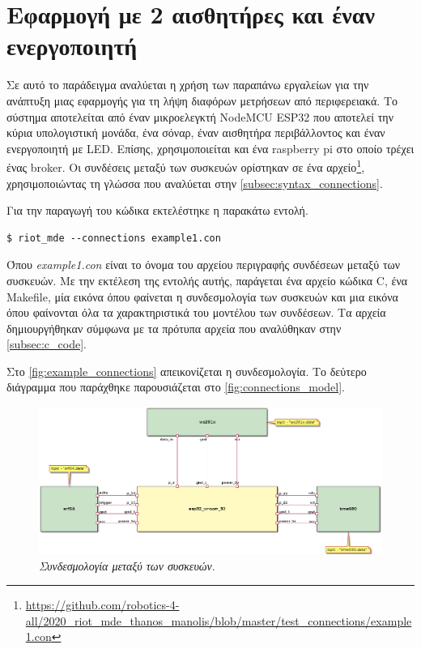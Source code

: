 \section{Εφαρμογή με 2 αισθητήρες και έναν ενεργοποιητή}
\label{sec:example1}

Σε αυτό το παράδειγμα αναλύεται η χρήση των παραπάνω εργαλείων για την ανάπτυξη μιας εφαρμογής για τη λήψη διαφόρων μετρήσεων από περιφερειακά. Το σύστημα αποτελείται από έναν μικροελεγκτή NodeMCU ESP32 που αποτελεί την κύρια υπολογιστική μονάδα, ένα σόναρ, έναν αισθητήρα περιβάλλοντος και έναν ενεργοποιητή με LED. Επίσης, χρησιμοποιείται και ένα raspberry pi στο οποίο τρέχει ένας broker. Οι συνδέσεις μεταξύ των συσκευών ορίστηκαν σε ένα αρχείο\footnote{\url{https://github.com/robotics-4-all/2020_riot_mde_thanos_manolis/blob/master/test_connections/example1.con}}, χρησιμοποιώντας τη γλώσσα που αναλύεται στην \autoref{subsec:syntax_connections}.

Για την παραγωγή του κώδικα εκτελέστηκε η παρακάτω εντολή.

\begin{lstlisting}
$ riot_mde --connections example1.con
\end{lstlisting}

Όπου \textit{example1.con} είναι το όνομα του αρχείου περιγραφής συνδέσεων μεταξύ των συσκευών. Με την εκτέλεση της εντολής αυτής, παράγεται ένα αρχείο κώδικα C, ένα Makefile, μία εικόνα όπου φαίνεται η συνδεσμολογία των συσκευών και μια εικόνα όπου φαίνονται όλα τα χαρακτηριστικά του μοντέλου των συνδέσεων. Τα αρχεία δημιουργήθηκαν σύμφωνα με τα πρότυπα αρχεία που αναλύθηκαν στην \autoref{subsec:c_code}.

Στο \autoref{fig:example_connections} απεικονίζεται η συνδεσμολογία. Το δεύτερο διάγραμμα που παράχθηκε παρουσιάζεται στο \autoref{fig:connections_model}.

\begin{figure}[!ht]
	\centering
	\includegraphics[width=1.0\textwidth]{./images/chapter6/example1a.png}
	\caption[\textit{Συνδεσμολογία μεταξύ των συσκευών}.]{\textit{Συνδεσμολογία μεταξύ των συσκευών}.}
	\label{fig:example_connections}
\end{figure}

